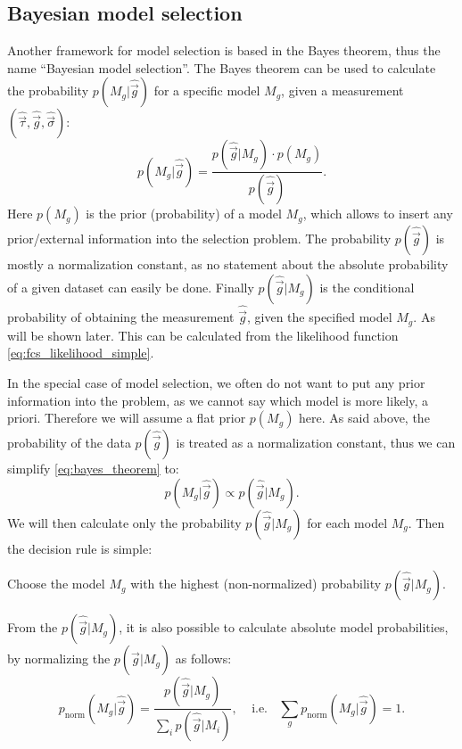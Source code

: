\documentclass[a4paper,notitlepage]{article}
\begin{document}
\subsection{Bayesian model selection}
Another framework for model selection \cite{HE2012,GUO2012} is based in the Bayes theorem, thus the name ``Bayesian model selection''. The Bayes theorem can be used to calculate the probability $p(M_g|\hat{\vec{g}})$ for a specific model $M_g$, given a measurement $(\hat{\vec{\tau}}, \hat{\vec{g}}, \hat{\vec{\sigma}})$:
\begin{equation}\label{eq:bayes_theorem}
    p(M_g|\hat{\vec{g}})=\frac{p(\hat{\vec{g}}|M_g)\cdot p(M_g)}{p(\hat{\vec{g}})}.
\end{equation}
Here $p(M_g)$ is the prior (probability) of a model $M_g$, which allows to insert any prior/external information into the selection problem. The probability $p(\hat{\vec{g}})$ is mostly a normalization constant, as no statement about the absolute probability of a given dataset can easily be done. Finally $p(\hat{\vec{g}}|M_g)$ is the conditional probability of obtaining the measurement $\hat{\vec{g}}$, given the specified model $M_g$. As will be shown later. This can be calculated from the likelihood function \eqref{eq:fcs_likelihood_simple}. 

In the special case of model selection, we often do not want to put any prior information into the problem, as we cannot say which model is more likely, a priori. Therefore we will assume a flat prior $p(M_g)$ here. As said above, the probability of the data $p(\hat{\vec{g}})$ is treated as a normalization constant, thus we can simplify \eqref{eq:bayes_theorem} to:
\begin{equation}\label{eq:bayes_theorem_simplified}
    p(M_g|\hat{\vec{g}})\propto p(\hat{\vec{g}}|M_g).
\end{equation}
We will then calculate only the probability $p(\hat{\vec{g}}|M_g)$ for each model $M_g$. Then the decision rule is simple:
\begin{center}
  Choose the model $M_g$ with the highest (non-normalized) probability $p(\hat{\vec{g}}|M_g)$.
\end{center}
From the $p(\hat{\vec{g}}|M_g)$, it is also possible to calculate absolute model probabilities, by normalizing the $p(\hat{\vec{g}}|M_g)$ as follows:
\begin{equation}\label{eq:bayes_modelprob_normalized}
    p_\text{norm}(M_g|\hat{\vec{g}})= \frac{p(\hat{\vec{g}}|M_g)}{\sum\limits_i p(\hat{\vec{g}}|M_i)},\ \ \ \ \ \text{i.e.}\ \ \ \ \sum\limits_g p_\text{norm}(M_g|\hat{\vec{g}})=1.
\end{equation}
\end{document}
